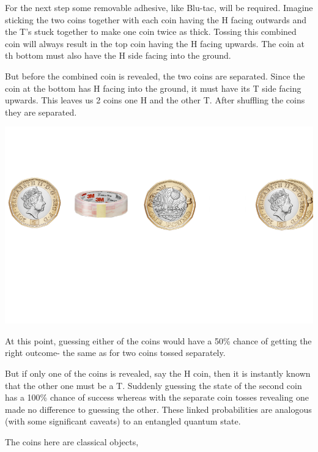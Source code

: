 \documentclass{book}
\begin{document}
For the next step some removable adhesive, like Blu-tac, will be required. Imagine sticking the two coins together with each coin having the H facing outwards and the T's stuck together to make one coin twice as thick. Tossing this combined coin will always result in the top coin having the H facing upwards. The coin at th bottom must also have the H side facing into the ground. 

But before the combined coin is revealed, the two coins are separated. Since the coin at the bottom has H facing into the ground, it must have its T side facing upwards. This leaves us 2 coins one H and the other T. After shuffling the coins they are separated. 

\includegraphics[scale=0.4]{images/Entanglement.png}

At this point, guessing either of the coins would have a 50\% chance of getting the right outcome- the same as for two coins tossed separately. 

But if only one of the coins is revealed, say the H coin, then it is instantly known that the other one must be a T. Suddenly guessing the state of the second coin has a 100\% chance of success whereas with the separate coin tosses revealing one made no difference to guessing the other. These linked probabilities are analogous (with some significant caveats) to an entangled quantum state.

The coins here are classical objects, 


\end{document}
